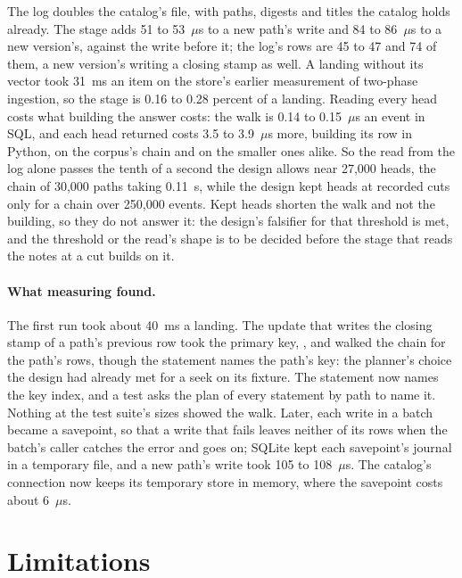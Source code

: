 \documentclass[11pt]{article}
\theoremstyle{plain}
\theoremstyle{definition}
\newcommand{\lean}[1]{\path{#1}}
\begin{document}
The log doubles the catalog's file, with paths, digests and titles the catalog holds already. The
stage adds 51 to 53~$\mu$s to a new path's write and 84 to 86~$\mu$s to a new version's, against
the write before it; the log's rows are 45 to 47 and 74 of them, a new version's writing a
closing stamp as well. A landing without its vector took 31~ms an item on the store's earlier
measurement of two-phase ingestion, so the stage is 0.16 to 0.28 percent of a landing. Reading
every head costs what building the answer costs: the walk is 0.14 to 0.15~$\mu$s an event in
SQL, and each head returned costs 3.5 to 3.9~$\mu$s more, building its row in Python, on the
corpus's chain and on the smaller ones alike. So the read from the log alone passes the tenth of a
second the design allows near 27{,}000 heads, the chain of 30{,}000 paths taking 0.11~s, while the
design kept heads at recorded cuts only for a chain over 250{,}000 events. Kept heads shorten the
walk and not the building, so they do not answer it: the design's falsifier for that threshold is
met, and the threshold or the read's shape is to be decided before the stage that reads the notes
at a cut builds on it.

\paragraph{What measuring found.}
The first run took about 40~ms a landing. The update that writes the closing stamp of a path's
previous row took the primary key, \lean{(chain, seq)}, and walked the chain for the path's rows,
though the statement names the path's key: the planner's choice the design had already met for a
seek on its fixture. The statement now names the key index, and a test asks the plan of every
statement by path to name it. Nothing at the test suite's sizes showed the walk. Later, each write
in a batch became a savepoint, so that a write that fails leaves neither of its rows when the
batch's caller catches the error and goes on; SQLite kept each savepoint's journal in a temporary
file, and a new path's write took 105 to 108~$\mu$s. The catalog's connection now keeps its
temporary store in memory, where the savepoint costs about 6~$\mu$s.

\section{Limitations}
\end{document}
